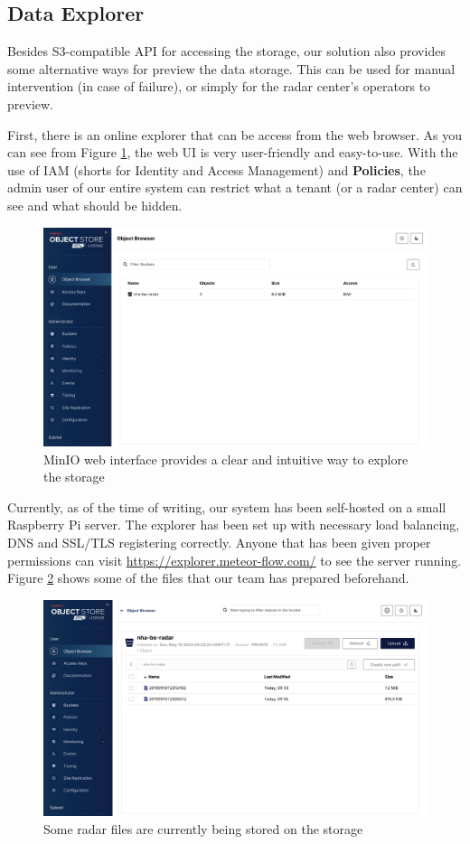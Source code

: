 \subsection{Data Explorer}
Besides S3-compatible API for accessing the storage, our solution also provides
some alternative ways for preview the data storage. This can be used for manual
intervention (in case of failure), or simply for the radar center's operators to
preview.

First, there is an online explorer that can be access from the web browser. As
you can see from Figure \ref{fig:minio-home}, the web UI is very user-friendly
and easy-to-use. With the use of IAM (shorts for Identity and Access Management)
and \textbf{Policies}, the admin user of our entire system can restrict what a
tenant (or a radar center) can see and what should be hidden.

\begin{figure}[H]
    \centering
    \includegraphics[width=0.8\linewidth]{Images/4.3-datastore/minio-bucket.png}
    \vspace{1em}
    \caption{MinIO web interface provides a clear and intuitive way to explore the storage}
    \label{fig:minio-home}
\end{figure}

Currently, as of the time of writing, our system has been self-hosted on a small
Raspberry Pi server. The explorer has been set up with necessary load balancing,
DNS and SSL/TLS registering correctly. Anyone that has been given proper
permissions can visit \url{https://explorer.meteor-flow.com/} to see the server
running. Figure \ref{fig:minio-files} shows some of the files that our team has
prepared beforehand.

\begin{figure}[H]
    \centering
    \includegraphics[width=0.8\linewidth]{Images/4.3-datastore/minio-files.png}
    \vspace{1em}
    \caption{Some radar files are currently being stored on the storage}
    \label{fig:minio-files}
\end{figure}


